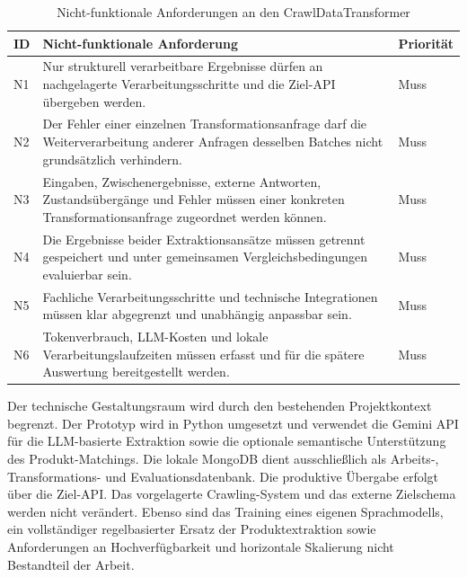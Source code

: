 \begin{table}[H]
    \centering
    \footnotesize
    \setlength{\tabcolsep}{4pt}
    \renewcommand{\arraystretch}{1.08}
    \begin{tabular}{
        |p{}
        |p{}
        |p{}|
    }
        \hline
        \textbf{ID} &
        \textbf{Nicht-funktionale Anforderung} &
        \textbf{Priorität} \\
        \hline

        N1 &
        Nur strukturell verarbeitbare Ergebnisse dürfen an nachgelagerte Verarbeitungsschritte und die Ziel-API übergeben werden. &
        Muss \\
        \hline

        N2 &
        Der Fehler einer einzelnen Transformationsanfrage darf die Weiterverarbeitung anderer Anfragen desselben Batches nicht grundsätzlich verhindern. &
        Muss \\
        \hline

        N3 &
        Eingaben, Zwischenergebnisse, externe Antworten, Zustandsübergänge und Fehler müssen einer konkreten Transformationsanfrage zugeordnet werden können. &
        Muss \\
        \hline

        N4 &
        Die Ergebnisse beider Extraktionsansätze müssen getrennt gespeichert und unter gemeinsamen Vergleichsbedingungen evaluierbar sein. &
        Muss \\
        \hline

        N5 &
        Fachliche Verarbeitungsschritte und technische Integrationen müssen klar abgegrenzt und unabhängig anpassbar sein. &
        Muss \\
        \hline

        N6 &
        Tokenverbrauch, LLM-Kosten und lokale Verarbeitungslaufzeiten müssen erfasst und für die spätere Auswertung bereitgestellt werden. &
        Muss \\
        \hline
    \end{tabular}
    \caption{Nicht-funktionale Anforderungen an den CrawlDataTransformer}
    \label{tab:non-functional-requirements}
\end{table}

Der technische Gestaltungsraum wird durch den bestehenden Projektkontext begrenzt. Der Prototyp wird in Python umgesetzt und verwendet die Gemini API für die LLM-basierte Extraktion 
sowie die optionale semantische Unterstützung des Produkt-Matchings. Die lokale MongoDB dient ausschließlich als Arbeits-, Transformations- und Evaluationsdatenbank. Die produktive 
Übergabe erfolgt über die Ziel-API. Das vorgelagerte Crawling-System und das externe Zielschema werden nicht verändert. Ebenso sind das Training eines eigenen Sprachmodells, ein 
vollständiger regelbasierter Ersatz der Produktextraktion sowie Anforderungen an Hochverfügbarkeit und horizontale Skalierung nicht Bestandteil der Arbeit.

